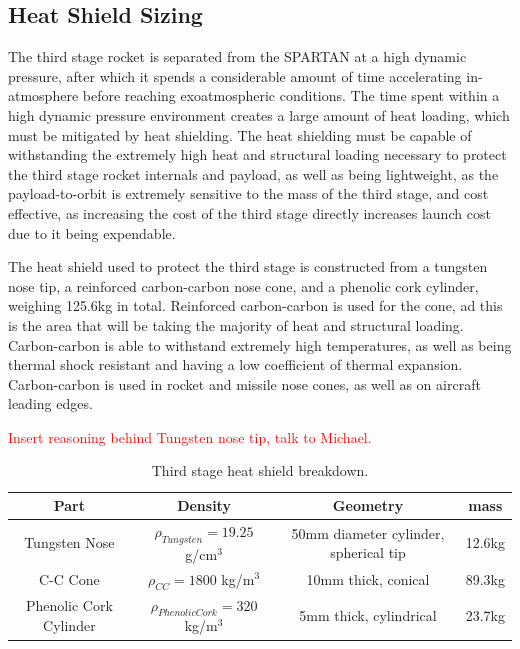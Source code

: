 \subsection{Heat Shield Sizing}

The third stage rocket is separated from the SPARTAN at a high dynamic pressure, after which it spends a considerable amount of time accelerating in-atmosphere before reaching exoatmospheric conditions. The time spent within a high dynamic pressure environment creates a large amount of heat loading, which must be mitigated by heat shielding. The heat shielding must be capable of withstanding the extremely high heat and structural loading necessary to protect the third stage rocket internals and payload, as well as being lightweight, as the payload-to-orbit is extremely sensitive to the mass of the third stage, and cost effective, as increasing the cost of the third stage directly increases launch cost due to it being expendable. 


The heat shield used to protect the third stage is constructed from a tungsten nose tip, a reinforced carbon-carbon nose cone, and a phenolic cork cylinder, weighing 125.6kg in total. Reinforced carbon-carbon is used for the cone, ad this is the area that will be taking the majority of heat and structural loading. Carbon-carbon is able to withstand extremely high temperatures, as well as being thermal shock resistant and having a low coefficient of thermal expansion\cite{Fitzer}. Carbon-carbon is used in rocket and missile nose cones, as well as on aircraft leading edges\cite{Fitzer}. 

\textcolor{red}{Insert reasoning behind Tungsten nose tip, talk to Michael. }

		\begin{table}[h]
			\centering
\begin{tabular}{|c|c|c|c|}
	\hline  Part & Density & Geometry & mass \\ 
	\hline  Tungsten Nose & $\rho_{Tungsten} = 19.25$  g/cm$^3$ & 50mm diameter cylinder, spherical tip & 12.6kg \\ 
		\hline C-C Cone & $\rho_{CC} = 1800$  kg/m$^3$ & 10mm thick, conical & 89.3kg \\ 
			\hline Phenolic Cork Cylinder & $\rho_{Phenolic Cork} = 320$  kg/m$^3$ & 5mm thick, cylindrical & 23.7kg \\ 
	\hline 
\end{tabular} 
\caption{Third stage heat shield breakdown.}
\label{tab:3rdHeatShield}
\end{table}
		
